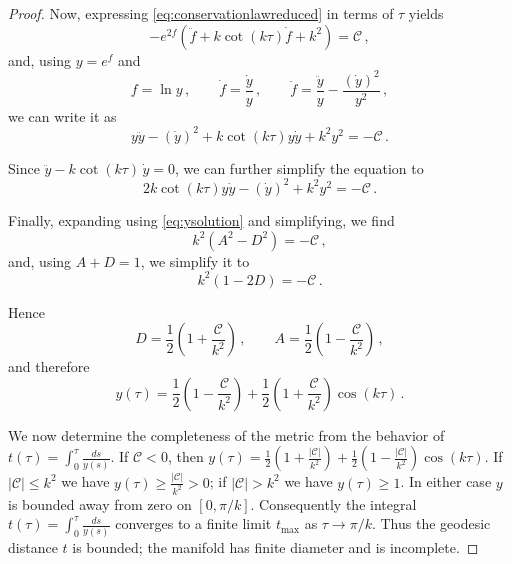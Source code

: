 \documentclass[10pt,a4paper]{amsart}
\newcommand{\cC}{\mathcal{C}}
\begin{document}
\begin{proof}
Now, expressing \eqref{eq:conservationlawreduced} in terms of $\tau$ yields
\begin{equation*}
- e^{2f}\left(\ddot{f} + k\cot(k\tau)\dot{f} + k^2\right) = \cC \,,
\end{equation*}
and, using $y=e^f$ and
\begin{equation*}
f = \ln y \,, \qquad \dot{f} = \frac{\dot{y}}{y} \,, \qquad \ddot{f} = \frac{\ddot{y}}{y} - \frac{(\dot{y})^2}{y^2} \,,
\end{equation*}
we can write it as
\begin{equation*}
y\ddot{y} - (\dot{y})^2 + k\cot(k\tau)y\dot{y} + k^2y^2 = - \cC \,.
\end{equation*}

Since $\ddot{y} - k\cot(k\tau)\,\dot{y} = 0$, we can further simplify the equation to
\begin{equation*}
2k\cot(k\tau)y\dot{y} - (\dot{y})^2 + k^2y^2 = - \cC \,.
\end{equation*}

Finally, expanding using \eqref{eq:ysolution} and simplifying, we find
\begin{equation*}
k^2(A^2 - D^2) = - \cC \,,
\end{equation*}
and, using $A+D=1$, we simplify it to
\begin{equation}\label{eq:Dcondition}
k^2(1 - 2D) = - \cC \,.
\end{equation}

Hence
\begin{equation*}
D = \frac12\left(1 + \frac{\cC}{k^2}\right) \,, \qquad A = \frac12\left(1 - \frac{\cC}{k^2}\right) \,,
\end{equation*}
and therefore
\begin{equation}\label{eq:ysolutionfinal}
y(\tau) = \frac12\left(1-\frac{\cC}{k^2}\right) + \frac12\left(1+\frac{\cC}{k^2}\right)\cos(k\tau) \,.
\end{equation}

We now determine the completeness of the metric from the behavior of $t(\tau) = \int_0^\tau \frac{ds}{y(s)}$. If $\cC < 0$, then $y(\tau)=\tfrac12\left(1+\frac{|\cC|}{k^2}\right) + \tfrac12\left(1-\frac{|\cC|}{k^2}\right)\cos(k\tau)$. If $|\cC|\le k^2$ we have $y(\tau)\ge \frac{|\cC|}{k^2}>0$; if $|\cC|>k^2$ we have $y(\tau)\ge1$. In either case $y$ is bounded away from zero on $[0,\pi/k]$. Consequently the integral $t(\tau) = \int_0^\tau \frac{ds}{y(s)}$ converges to a finite limit $t_{\max}$ as $\tau\to\pi/k$. Thus the geodesic distance $t$ is bounded; the manifold has finite diameter and is incomplete.


\end{proof}
\end{document}
